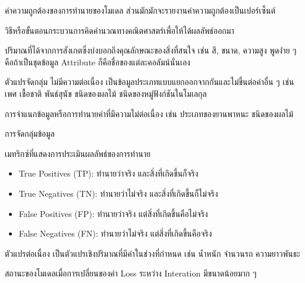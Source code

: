 \begin{description}[style=nextline]
    \item[Accuracy] ค่าความถูกต้องของการทำนายของโมเดล ส่วนมักมักจะรายงานค่าความถูกต้องเป็นเปอร์เซ็นต์

    \item[Algorithm] วิธีหรือขั้นตอนกระบวนการคิดคำนวณทางคณิตศาสตร์เพื่อให้ได้ผลลัพธ์ออกมา

    \item[Attribute] ปริมาณที่ได้จากการสังเกตซึ่งบ่งบอกถึงคุณลักษณะของสิ่งที่สนใจ เช่น สี, ขนาด, ความสูง พูดง่่าย ๆ คือถ้าเป็นชุดข้อมูล 
    Attribute ก็คือชื่อของแต่ละคอลัมน์นั่นเอง

    \item[Categorical Variables] ตัวแปรจัดกลุ่ม ไม่มีความต่อเนื่อง เป็นข้อมูลประเภทแบบแยกออกจากกันและไม่ขึ้นต่อค่าอื่น ๆ เช่น 
    เพศ เชื้อชาติ พันธ์สุนัข ชนิดของผลไม้ ชนิดของหมู่ฟังก์ชันในโมเลกุล

    \item[Classification] การจำแนกข้อมูลหรือการทำนายค่าที่มีความไม่ต่อเนื่อง เช่น ประเภทของยานพาหนะ ชนิดของผลไม้
 
    \item[Clustering] การจัดกลุ่มข้อมูล

    \item[Confusion matrix] เมทริกซ์ที่แสดงการประเมินผลลัพธ์ของการทำนาย
    \begin{itemize}
        \item True Positives (TP): ทำนายว่าจริง และสิ่งที่เกิดขึ้นก็จริง
        \item True Negatives (TN): ทำนายว่าไม่จริง และสิ่งที่เกิดขึ้นก็ไม่จริง
        \item False Positives (FP): ทำนายว่าจริง แต่สิ่งที่เกิดขึ้นคือไม่จริง
        \item False Negatives (FN): ทำนายว่าไม่จริง แต่สิ่งที่เกิดขึ้นคือจริง
    \end{itemize}

    \item[Continuous Variables] ตัวแปรต่อเนื่อง เป็นตัวแปรเชิงปริมาณที่มีค่าในช่วงที่กำหนด เช่น น้ำหนัก จำนวนรถ ความยาวพันธะ

    \item[Convergence] สถานะของโมเดลเมื่อการเปลี่ยนของค่า Loss ระหว่าง Interation มีขนาดน้อยมาก ๆ


\end{description}
